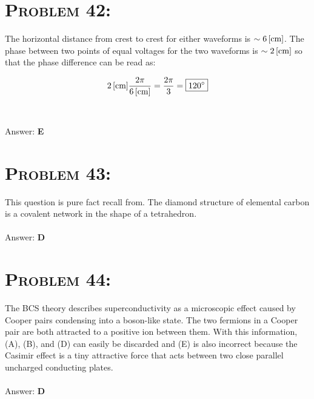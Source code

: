 \documentclass{article}
\begin{document}

\section{\textsc{Problem 42:}} The horizontal distance from crest to crest for either waveforms is $\sim \unit[6]{[cm]}$. The phase between two points of equal voltages for the two waveforms is $\sim \unit[2]{[cm]}$ so that the phase difference can be read as:

\begin{align}
\unit[2]{[cm]} \frac{2 \pi}{\unit[6]{[cm]}} = \frac{2 \pi}{3} = \boxed{120^{\circ}}\nonumber
\end{align}
\\\\
Answer: \textbf{\textcolor{ProcessBlue}E}\\


\section{\textsc{Problem 43:}} This question is pure fact recall from. The diamond structure of elemental carbon is a covalent network in the shape of a tetrahedron.
\\\\
Answer: \textbf{\textcolor{ProcessBlue}D}\\


\section{\textsc{Problem 44:}} The BCS theory describes superconductivity as a microscopic effect caused by Cooper pairs condensing into a boson-like state. The two fermions in a Cooper pair are both attracted to a positive ion between them. With this information, (A), (B), and (D) can easily be discarded and (E) is also incorrect because the Casimir effect is a tiny attractive force that acts between two close parallel uncharged conducting plates.
\\\\
Answer: \textbf{\textcolor{ProcessBlue}D}\\

\end{document}
